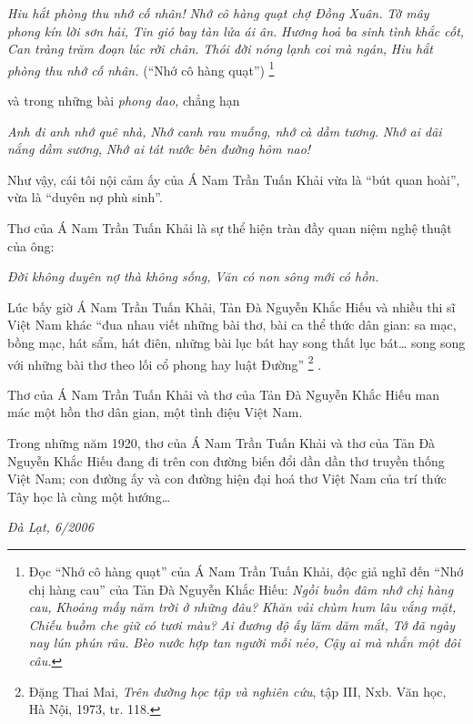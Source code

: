 \documentclass[../main.tex]{subfiles}
\begin{document}
\begin{multicols}{2}
\begin{blockquote}
\textit{Hiu hắt phòng thu nhớ cố nhân!}        
\textit{Nhớ cô hàng quạt chợ Đồng Xuân.}        
\textit{Tờ mây phong kín lời sơn hải,}        
\textit{Tin gió bay tàn lửa ái ân.}        
\textit{Hương hoả ba sinh tình khắc cốt,}        
\textit{Can tràng trăm đoạn lúc rời chân.}        
\textit{Thói đời nóng lạnh coi mà ngán,}        
\textit{Hiu hắt phòng thu nhớ cố nhân.}        
(“Nhớ cô hàng quạt”) \footnote{
Đọc “Nhớ cô hàng quạt” của Á Nam Trần Tuấn Khải, độc giả nghĩ đến “Nhớ chị hàng cau” của Tản Đà Nguyễn Khắc Hiếu: 
\textit{Ngồi buồn đâm nhớ chị hàng cau,} 
\textit{Khoảng mấy năm trời ở những đâu?} 
\textit{Khăn vải chùm hum lâu vắng mặt,} 
\textit{Chiếu buồm che giữ có tươi màu?} 
\textit{Ai đương độ ấy lăm dăm mắt,} 
\textit{Tớ đã ngày nay lún phún râu.} 
\textit{Bèo nước hợp tan người mỗi nẻo,} 
\textit{Cậy ai mà nhắn một đôi câu.}}  

\end{blockquote}
 
và trong những bài \textit{phong dao, }chẳng hạn 
\begin{blockquote}
        
\textit{Anh đi anh nhớ quê nhà,}        
\textit{Nhớ canh rau muống, nhớ cà dầm tương.}        
\textit{Nhớ ai dãi nắng dầm sương,} 
\textit{Nhớ ai tát nước bên đường hôm nao!} 

\end{blockquote}
 
Như vậy, cái tôi nội cảm ấy của Á Nam Trần Tuấn Khải vừa là “bút quan hoài”, vừa là “duyên nợ phù sinh”. 
 
Thơ của Á Nam Trần Tuấn Khải là sự thể hiện tràn đầy quan niệm nghệ thuật của ông:        
\begin{blockquote}
        
\textit{Đời không duyên nợ thà không sống,} 
\textit{Văn có non sông mới có hồn.} 

\end{blockquote}
 
Lúc bấy giờ Á Nam Trần Tuấn Khải, Tản Đà Nguyễn Khắc Hiếu và nhiều thi sĩ Việt Nam khác “đua nhau viết những bài thơ, bài ca thể thức dân gian: sa mạc, bồng mạc, hát sẩm, hát điên, những bài lục bát hay song thất lục bát… song song với những bài thơ theo lối cổ phong hay luật Đường” \footnote{
Đặng Thai Mai, \textit{Trên đường học tập và nghiên cứu}, tập III, Nxb. Văn học, Hà Nội, 1973, tr. 118.} . 
 
Thơ của Á Nam Trần Tuấn Khải và thơ của Tản Đà Nguyễn Khắc Hiếu man mác một hồn thơ dân gian, một tình điệu Việt Nam. 
 
Trong những năm 1920, thơ của Á Nam Trần Tuấn Khải và thơ của Tản Đà Nguyễn Khắc Hiếu đang đi trên con đường biến đổi dần dần thơ truyền thống Việt Nam; con đường ấy và con đường hiện đại hoá thơ Việt Nam của trí thức Tây học là cùng một hướng… 
 
\textit{Đà Lạt, 6/2006} 
 



\end{multicols}
\end{document}
